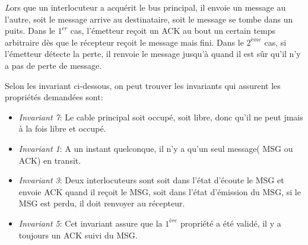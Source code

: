 \documentclass[a4paper,11pt]{report}
\begin{document}
	{\huge \itshape L}ors que un interlocuteur a acquérit le bus principal, il envoie un message au l'autre, soit le message arrive au destinataire, soit le message se tombe dans un puits. Dans le $1^{er}$ cas, l'émetteur reçoit un ACK au bout un certain temps arbitraire dès que le récepteur reçoit le message mais fini. Dans le $2^{ème}$ cas, si l'émetteur détecte la perte, il renvoie le message jusqu'à quand il est sûr qu'il n'y a pas de perte de message.
	
	
	Selon les invariant ci-dessous, on peut trouver les invariants qui assurent les propriétés demandées sont:
	
		\begin{itemize}
		\item \textit{Invariant 7}: Le cable principal soit occupé, soit libre, donc qu'il ne peut jmais à la fois libre et occupé.
		\item \textit{Invariant 1}: A un instant quelconque, il n'y a qu'un seul message( MSG ou ACK) en transit.
		\item \textit{Invariant 3}: Deux interlocuteurs sont soit dans l'état d'écoute le MSG et envoie ACK quand il reçoit le MSG, soit dans l'état d'émission du MSG, si le MSG est perdu, il doit renvoyer au récepteur.
		\item \textit{Invariant 5}: Cet invariant assure que la $1^{ère}$ propriété a été validé, il y a toujours un ACK suivi du MSG.
	\end{itemize}
	
	
\end{document}
